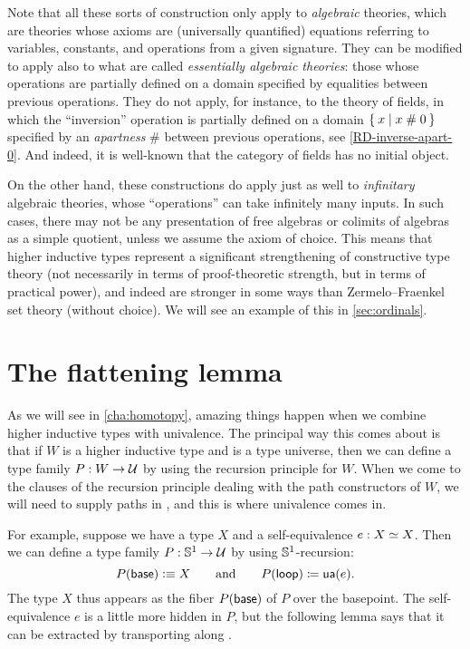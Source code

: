 \mentalpause

Note that all these sorts of construction only apply to \emph{algebraic} theories, which are theories whose axioms are (universally quantified) equations referring to variables, constants, and operations from a given signature.
They can be modified to apply also to what are called \emph{essentially algebraic theories}: those whose operations are partially defined on a domain specified by equalities between previous operations.
They do not apply, for instance, to the theory of fields, in which the ``inversion'' operation is partially defined on a domain $\Set{x | x \mathrel{\#} 0}$ specified by an \emph{apartness} $\#$ between previous operations, see \autoref{RD-inverse-apart-0}.
And indeed, it is well-known that the category of fields has no initial object.
%

On the other hand, these constructions do apply just as well to \emph{infinitary} algebraic theories, whose ``operations'' can take infinitely many inputs.
In such cases, there may not be any presentation of free algebras or colimits of algebras as a simple quotient, unless we assume the axiom of choice.
This means that higher inductive types represent a significant strengthening of constructive type theory (not necessarily in terms of proof-theoretic strength, but in terms of practical power), and indeed are stronger in some ways than Zermelo--Fraenkel set theory (without choice).
We will see an example of this in \autoref{sec:ordinals}.


\section{The flattening lemma}
\label{sec:flattening}

As we will see in \autoref{cha:homotopy}, amazing things happen when we combine higher inductive types with univalence.
The principal way this comes about is that if $W$ is a higher inductive type and \UU is a type universe, then we can define a type family $P:W\to \mathcal{U}$ by using the recursion principle for $W$.
When we come to the clauses of the recursion principle dealing with the path constructors of $W$, we will need to supply paths in \UU, and this is where univalence comes in.

For example, suppose we have a type $X$ and a self-equivalence $e:X \simeq X$.
Then we can define a type family $P:\mathbb{S}^1 \to \mathcal{U}$ by using $\mathbb{S}^1$-recursion:
\begin{equation*}
  P(\mathsf{base}) \vcentcolon\equiv X
  \qquad\text{and}\qquad
  {P}\mathopen{}\left({\mathsf{loop}}\right)\mathclose{} \coloneqq \mathsf{ua}(e).
\end{equation*}
The type $X$ thus appears as the fiber $P(\mathsf{base})$ of $P$ over the basepoint.
The self-equivalence $e$ is a little more hidden in $P$, but the following lemma says that it can be extracted by transporting along \lloop.

